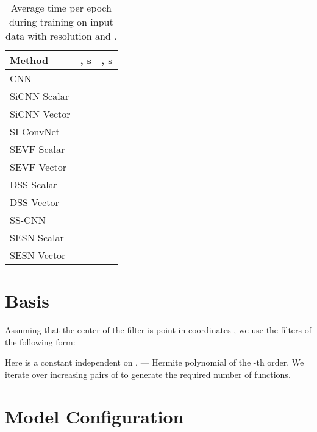 \documentclass{article} \usepackage{multirow}
\begin{document}
\begin{table}[h]
    \begin{center}
    \begin{tabular}{l|cc}
    \toprule
    Method              & , s           & , s \\ 
    \midrule
    CNN                 &                      &      \\
    SiCNN Scalar        &                     &     \\
    SiCNN Vector        &                     &      \\
    SI-ConvNet          &                     &      \\
    SEVF Scalar         &                     &      \\
    SEVF Vector         &                     &      \\
    DSS Scalar          &                      &      \\
    DSS Vector          &                      &      \\
    SS-CNN              &                     &     \\ 
    \midrule
    SESN Scalar         &                      &      \\
    SESN Vector         &                      &     \\
    \bottomrule              
    \end{tabular}
    \end{center}
    \caption{Average time per epoch during training on input data with resolution 
    and .}
    \label{tab:appendix_time_performance}
\end{table} 


\section{Basis}
\label{sec:appendix_basis}
Assuming that the center of the filter is point  in coordinates , 
we use the filters of the following form:


Here  is a constant independent on ,  --- Hermite polynomial of the -th 
order. We iterate over increasing pairs of  to generate the required number of functions.



\newpage
\section{Model Configuration}
\end{document}
